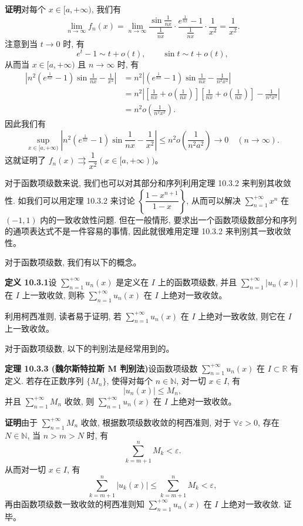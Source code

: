 \documentclass[UTF8, 12pt, fontset=fandol, oneside]{ctexart}
\begin{document}
\noindent\textbf{证明}\quad 对每个 $x\in[a,+\infty)$, 我们有
\[
  \lim_{n\to\infty}f_n(x)
  =\lim_{n\to\infty}\frac{\sin\frac1{nx}}{\frac1{nx}}\cdot
  \frac{e^{\frac1{nx}}-1}{\frac1{nx}}\cdot\frac1{x^2}
  =\frac1{x^2}.
\]
注意到当 $t\to0$ 时, 有
\[
  e^t-1\sim t+o(t),\qquad \sin t\sim t+o(t),
\]
从而当 $x\in[a,+\infty)$ 且 $n\to\infty$ 时, 有
\[
\begin{aligned}
  \left|n^2\left(e^{\frac1{nx}}-1\right)\sin\frac1{nx}-\frac1{x^2}\right|
  &=n^2\left|\left(e^{\frac1{nx}}-1\right)\sin\frac1{nx}-\frac1{n^2x^2}\right|\\
  &=n^2\left|\left[\frac1{nx}+o\left(\frac1{nx}\right)\right]
  \left[\frac1{nx}+o\left(\frac1{nx}\right)\right]-\frac1{n^2x^2}\right|\\
  &=n^2o\left(\frac1{n^2x^2}\right).
\end{aligned}
\]
因此我们有
\[
  \sup_{x\in[a,+\infty)}
  \left|n^2\left(e^{\frac1{nx}}-1\right)\sin\frac1{nx}-\frac1{x^2}\right|
  \leq n^2o\left(\frac1{n^2a^2}\right)\to0\quad(n\to\infty).
\]
这就证明了 $f_n(x)\rightrightarrows\dfrac1{x^2}(x\in[a,+\infty))$。

对于函数项级数来说, 我们也可以对其部分和序列利用定理 10.3.2 来判别其收敛性. 如我们可以用定理 10.3.2 来讨论 $\left\{\dfrac{1-x^{n+1}}{1-x}\right\}$, 从而可以解决 $\sum\limits_{n=1}^{+\infty}x^n$ 在 $(-1,1)$ 内的一致收敛性问题. 但在一般情形, 要求出一个函数项级数部分和序列的通项表达式不是一件容易的事情, 因此就很难用定理 10.3.2 来判别其一致收敛性。

对于函数项级数, 我们有以下的概念。

\noindent\textbf{定义 10.3.1}\quad 设 $\sum\limits_{n=1}^{+\infty}u_n(x)$ 是定义在 $I$ 上的函数项级数, 并且 $\sum\limits_{n=1}^{+\infty}|u_n(x)|$ 在 $I$ 上一致收敛, 则称 $\sum\limits_{n=1}^{+\infty}u_n(x)$ 在 $I$ 上绝对一致收敛。

利用柯西准则, 读者易于证明, 若 $\sum\limits_{n=1}^{+\infty}u_n(x)$ 在 $I$ 上绝对一致收敛, 则它在 $I$ 上一致收敛。

对于函数项级数, 以下的判别法是经常用到的。

\noindent\textbf{定理 10.3.3 (魏尔斯特拉斯 M 判别法)}\quad 设函数项级数 $\sum\limits_{n=1}^{+\infty}u_n(x)$ 在 $I\subset\mathbb R$ 有定义. 若存在正数序列 $\{M_n\}$, 使得对每个 $n\in\mathbb N$, 对一切 $x\in I$, 有
\[
  |u_n(x)|\leq M_n,
\]
并且 $\sum\limits_{n=1}^{+\infty}M_n$ 收敛, 则 $\sum\limits_{n=1}^{+\infty}u_n(x)$ 在 $I$ 上绝对一致收敛。

\noindent\textbf{证明}\quad 由于 $\sum\limits_{n=1}^{+\infty}M_n$ 收敛, 根据数项级数收敛的柯西准则, 对于 $\forall\varepsilon>0$, 存在 $N\in\mathbb N$, 当 $n>m>N$ 时, 有
\[
  \sum_{k=m+1}^n M_k<\varepsilon.
\]
从而对一切 $x\in I$, 有
\[
  \sum_{k=m+1}^n |u_k(x)|\leq\sum_{k=m+1}^n M_k<\varepsilon,
\]
再由函数项级数一致收敛的柯西准则知 $\sum\limits_{n=1}^{+\infty}u_n(x)$ 在 $I$ 上绝对一致收敛. 证毕。
\end{document}
